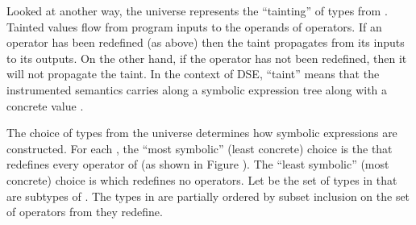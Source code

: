 ﻿\documentclass{IOS-Book-Article}
\begin{document}
\begin{mdP}[class={indent},data-line={428}]%
{}Looked at another way, the universe %
{}%
{} represents the %
{}{\textquotedblleft}tainting{\textquotedblright}%
{} of
types from %
{}%
{}. Tainted values flow from program inputs to the 
operands of operators. If an operator has been redefined
(as above) then the taint propagates from its inputs to its outputs.
On the other hand, if the operator has not been redefined, then it will
not propagate the taint. In the context of DSE, %
{}{\textquotedblleft}taint{\textquotedblright}%
{} means
that the instrumented semantics carries along a symbolic expression tree %
{}%
{}
along with a concrete value %
{}%
{}.%
\end{mdP}%
\begin{mdP}[class={indent},data-line={437}]%
{}The choice of types from the universe %
{}%
{} determines how symbolic
expressions are constructed. For each %
{}%
{}, the %
{}{\textquotedblleft}most symbolic{\textquotedblright}%
{}
(least concrete) choice is the %
{}%
{} that redefines every operator of %
{}%
{}
(as shown in Figure%
{}{\mdNbsp}%
{}).
The %
{}{\textquotedblleft}least symbolic{\textquotedblright}%
{} (most concrete) choice is %
{}%
{} which
redefines no operators.  Let %
{}%
{} be the
set of types in %
{}%
{} that are subtypes of %
{}%
{}. The types
in %
{}%
{} are partially ordered by subset inclusion on the 
set of operators from %
{}%
{} they redefine.%
\end{mdP}%
\end{document}
